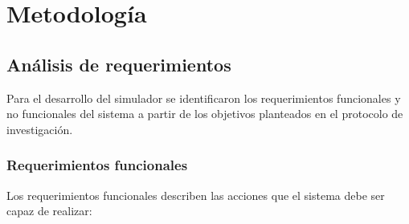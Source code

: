 
\section{Metodología}

\subsection{Análisis de requerimientos}

Para el desarrollo del simulador se identificaron los requerimientos
funcionales y no funcionales del sistema a partir de los objetivos
planteados en el protocolo de investigación.

\subsubsection{Requerimientos funcionales}

Los requerimientos funcionales describen las acciones que el sistema
debe ser capaz de realizar:

